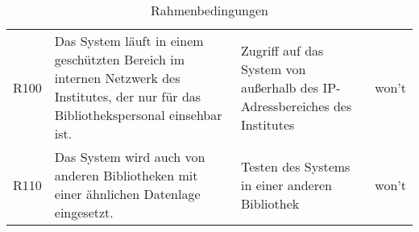 \begin{table}[h]
\begin{adjustbox}{max width=\textwidth}
\begin{tabular}{lp{6.5cm}p{6.5cm}l}
        R100                              &Das System läuft in einem geschützten Bereich im internen Netzwerk des Institutes, der nur für das Bibliothekspersonal einsehbar ist. & Zugriff auf das System von außerhalb des IP-Adressbereiches des Institutes  & won't\\
        R110                              &Das System wird auch von anderen Bibliotheken mit einer ähnlichen Datenlage eingesetzt. & Testen des Systems in einer anderen Bibliothek & won't\\
       \bottomrule
    \end{tabular}
    \end{adjustbox}
    \caption{%
        Rahmenbedingungen
    }
    \label{tab:Rahmenbedingungen}
    \end{table}
\endgroup









